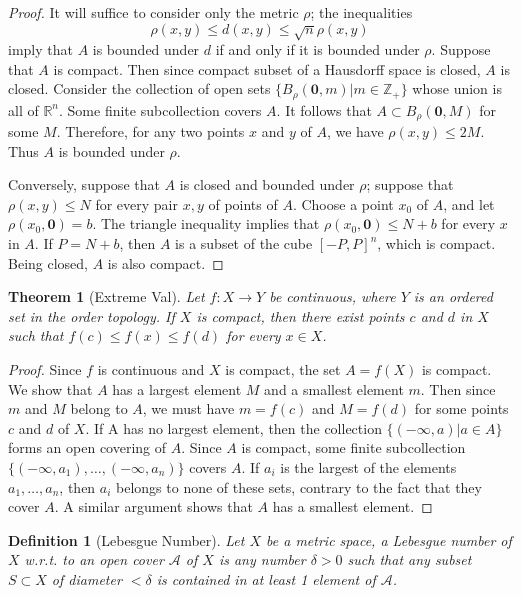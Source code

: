 \documentclass[article,11pt, reqno]{article}
\newtheorem*{theorem}{Theorem}
\newtheorem*{definition}{Definition}
\theoremstyle{remark}
\newcommand{\R}{\mathbb{R}}
\newcommand{\ra}{\rightarrow}
\newcommand{\Z}{\mathbb{Z}}
\newcommand{\<}{\langle}
\renewcommand{\>}{\rangle}
\begin{document}
\begin{proof}
    It will suffice to consider only the metric $\rho$; the inequalities
    $$
        \rho(x, y)\leq d(x, y)\leq \sqrt{n}\rho(x, y)
    $$
    imply that $A$ is bounded under $d$ if and only if it is bounded under $\rho$. Suppose that $A$ is compact. Then since compact subset of a Hausdorff space is closed, $A$ is closed. Consider the collection of open sets $\{B_{\rho}(\mathbf{0},m)|m\in\Z_+\}$ whose union is all of $\R^n$. Some finite subcollection covers $A$. It follows that $A\subset B_{\rho}(\mathbf{0}, M)$ for some $M$. Therefore, for any two points $x$ and $y$ of $A$, we have $\rho(x, y)\leq 2M$. Thus $A$ is bounded under $\rho$.

    Conversely, suppose that $A$ is closed and bounded under $\rho$; suppose that $\rho(x, y)\leq N$ for every pair $x, y$ of points of $A$. Choose a point $x_0$ of $A$, and let $\rho(x_0,\mathbf{0}) = b$. The triangle inequality implies that $\rho(x_0,\mathbf{0})\leq N + b$ for every $x$ in $A$. If $P = N + b$, then $A$ is a subset of the cube $[-P, P]^n$, which is compact. Being closed, $A$ is also compact.
\end{proof}
\begin{theorem}[Extreme Val]
    Let $f: X\ra Y$ be continuous, where $Y$ is an ordered set in the order topology. If $X$ is compact, then there exist points $c$ and $d$ in $X$ such that $f(c)\leq f(x)\leq f(d)$ for every $x\in X$.
\end{theorem}
\begin{proof}
    Since $f$ is continuous and $X$ is compact, the set $A = f (X)$ is compact. We show that $A$ has a largest element $M$ and a smallest element $m$. Then since $m$ and $M$ belong to $A$, we must have $m= f(c)$ and $M= f(d)$ for some points $c$ and $d$ of $X$. If A has no largest element, then the collection $\{(-\infty, a) | a\in A\}$ forms an open covering of $A$. Since $A$ is compact, some finite subcollection $\{(-\infty,a_1),\dots,(-\infty, a_n)\}$ covers $A$. If $a_i$ is the largest of the elements $a_1,\dots,a_n$, then $a_i$ belongs to none of these sets, contrary to the fact that they cover $A$. A similar argument shows that $A$ has a smallest element.
\end{proof}
\begin{definition}[Lebesgue Number]
    Let $X$ be a metric space, a Lebesgue number of $X$ w.r.t. to an open cover $\mathcal{A}$ of $X$ is any number $\delta>0$ such that any subset $S\subset X$ of diameter $<\delta$ is contained in at least 1 element of $\mathcal{A}$.
\end{definition}
\end{document}
